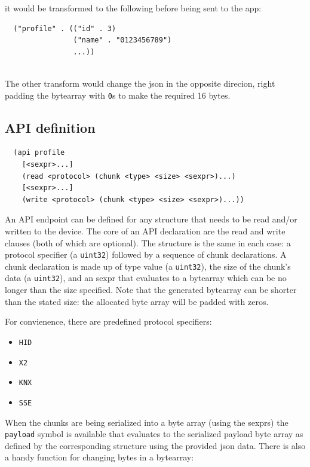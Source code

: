\documentclass[12pt]{article}
\begin{document}
\noindent it would be transformed to the following before being sent
to the app:

\begin{verbatim}
  ("profile" . (("id" . 3)
                ("name" . "0123456789")
                ...))
 
\end{verbatim}

\noindent The other transform would change the json in the opposite
direcion, right padding the bytearray with \verb|0|s to make the
required 16 bytes.

\subsection{API definition}

\begin{verbatim}
  (api profile
    [<sexpr>...]
    (read <protocol> (chunk <type> <size> <sexpr>)...)
    [<sexpr>...]
    (write <protocol> (chunk <type> <size> <sexpr>)...))
\end{verbatim}

\noindent An API endpoint can be defined for any structure that needs
to be read and/or written to the device. The core of an API
declaration are the read and write clauses (both of which are
optional). The structure is the same in each case: a protocol specifier
(a \verb|uint32|) followed by a sequence of chunk declarations. A chunk
declaration is made up of type value (a \verb|uint32|), the size of the chunk's
data (a \verb|uint32|), and an sexpr that evaluates to a bytearray which can be
no longer than the size specified. Note that the generated bytearray
can be shorter than the stated size: the allocated byte array will be
padded with zeros.

For convienence, there are predefined protocol specifiers:

\begin{itemize}
\item \verb|HID|
\item \verb|X2|
\item \verb|KNX|
\item \verb|SSE|
\end{itemize}

When the chunks are being serialized into a byte array (using the
sexprs) the \verb|payload| symbol is available that evaluates to the
serialized payload byte array as defined by the corresponding
structure using the provided json data. There is also a handy function
for changing bytes in a bytearray:
\end{document}
